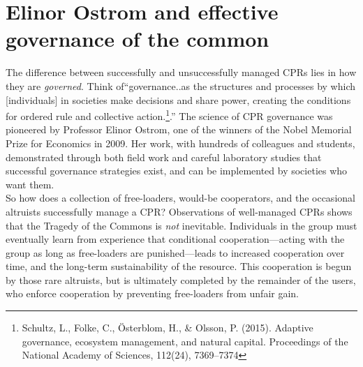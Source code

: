 \documentclass[amstex,12pt]{book}
\begin{document}
\section{Elinor Ostrom and effective governance of the common} \label{Elinor Ostrom's insights}
The difference between successfully and unsuccessfully managed CPRs lies in how they are \emph{governed}. Think of``governance..as the structures and processes by which [individuals] in societies make decisions and share power, creating the conditions for ordered rule and collective action.\footnote{Schultz, L., Folke, C., Österblom, H., \& Olsson, P. (2015). Adaptive governance, ecosystem management, and natural capital. Proceedings of the National Academy of Sciences, 112(24), 7369–7374}.'' The science of CPR governance was pioneered by Professor Elinor Ostrom, one of the winners of the Nobel Memorial Prize for Economics in 2009. Her work, with hundreds of colleagues and students, demonstrated through both field work and careful laboratory studies that successful governance strategies exist, and can be implemented by societies who want them.\\

So how does a collection of free-loaders, would-be cooperators, and the occasional altruists successfully manage a CPR? Observations of well-managed CPRs shows that the Tragedy of the Commons is \emph{not} inevitable.  Individuals in the group must eventually learn from experience that conditional cooperation---acting with the group as long as free-loaders are punished---leads to increased cooperation over time, and the long-term sustainability of the resource. This cooperation is begun by those rare altruists, but is ultimately completed by the remainder of the users, who enforce cooperation by preventing free-loaders from unfair gain. 
\end{document}
